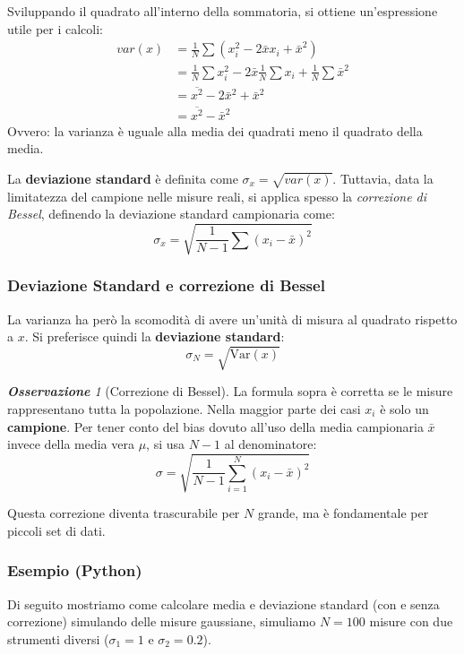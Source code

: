 \documentclass{article}
\theoremstyle{remark}
\newtheorem{osservazione}{\textbf{\color{ForestGreen}Osservazione}}
\begin{document}
Sviluppando il quadrato all'interno della sommatoria, si ottiene un'espressione utile per i calcoli:
\[
\begin{aligned}
var(x) &= \frac{1}{N} \sum (x_i^2 - 2 \bar{x} x_i + \bar{x}^2) \\
&= \frac{1}{N} \sum x_i^2 - 2 \bar{x} \frac{1}{N} \sum x_i + \frac{1}{N} \sum \bar{x}^2 \\
&= \overline{x^2} - 2\bar{x}^2 + \bar{x}^2 \\
&= \overline{x^2} - \bar{x}^2
\end{aligned}
\]
Ovvero: la varianza è uguale alla media dei quadrati meno il quadrato della media.

La \textbf{deviazione standard} è definita come $\sigma_x = \sqrt{var(x)}$. Tuttavia, data la limitatezza del campione nelle misure reali, si applica spesso la \textit{correzione di Bessel}, definendo la deviazione standard campionaria come:
\[
\sigma_x = \sqrt{\frac{1}{N-1} \sum (x_i - \bar{x})^2}
\]


\subsubsection{Deviazione Standard e correzione di Bessel}
La varianza ha però la scomodità di avere un'unità di misura al quadrato rispetto a $x$. Si preferisce quindi la \textbf{deviazione standard}:
\[ \sigma_N = \sqrt{\text{Var}(x)} \]

\begin{osservazione}[Correzione di Bessel]
La formula sopra è corretta se le misure rappresentano tutta la popolazione. Nella maggior parte dei casi $x_i$ è solo un \textbf{campione}. Per tener conto del bias dovuto all'uso della media campionaria $\bar{x}$ invece della media vera $\mu$, si usa $N-1$ al denominatore:
\begin{equation}
    \sigma = \sqrt{\frac{1}{N-1} \sum_{i=1}^{N} (x_i - \bar{x})^2}
\end{equation}
\end{osservazione}
Questa correzione diventa trascurabile per $N$ grande, ma è fondamentale per piccoli set di dati.


\subsubsection*{Esempio (Python)}
Di seguito mostriamo come calcolare media e deviazione standard (con e senza correzione) simulando delle misure gaussiane, simuliamo $N=100$ misure con due strumenti diversi ($\sigma_1=1$ e $\sigma_2=0.2$).
\end{document}
